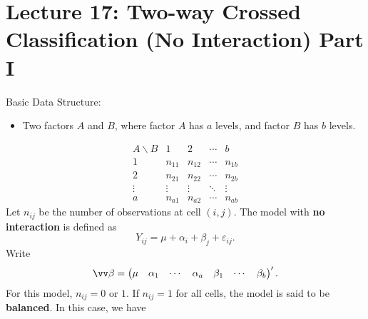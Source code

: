 \section{Lecture 17: Two-way Crossed Classification (No Interaction) Part I}
Basic Data Structure:
\begin{itemize}
    \item Two factors $ A $ and $ B $, where
          factor $ A $ has $ a $ levels, and factor $ B $
          has $ b $ levels.
\end{itemize}
\[ \begin{array}{c|cccc}
        A\backslash B & 1      & 2      & \cdots & b      \\
        \hline
        1             & n_{11} & n_{12} & \cdots & n_{1b} \\
        2             & n_{21} & n_{22} & \cdots & n_{2b} \\
        \vdots        & \vdots & \vdots & \ddots & \vdots \\
        a             & n_{a1} & n_{a2} & \cdots & n_{ab}
    \end{array} \]
Let $ n_{ij} $ be the number of observations at cell $ (i,j) $. The model with
\textbf{no interaction} is defined as
\[ Y_{ij}=\mu+\alpha_i+\beta_j+\varepsilon_{ij}. \]
Write
\[ \Vector{\beta}=\begin{pmatrix}
        \mu & \alpha_1 & \cdots & \alpha_a & \beta_1 & \cdots & \beta_b
    \end{pmatrix}'. \]
For this model, $ n_{ij}=0 $ or $ 1 $. If $ n_{ij}=1 $ for all cells, the model
is said to be \textbf{balanced}. In this case, we have
